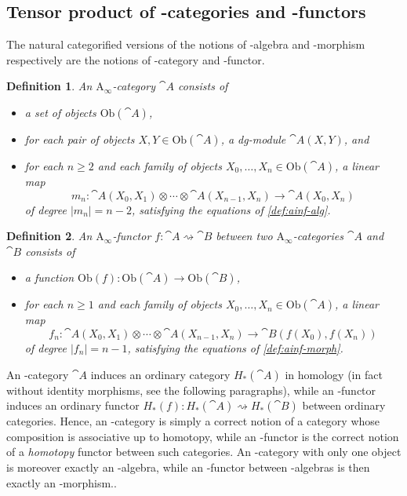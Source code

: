 \documentclass[twoside, 12pt]{amsart}
\newtheorem{definition}{Definition}[section]
\theoremstyle{remark}
\begin{document}
\subsection{Tensor product of \Ainf -categories and \Ainf -functors}

The natural categorified versions of the notions of \Ainf -algebra and \Ainf -morphism respectively are the notions of \Ainf -category and \Ainf -functor.

\begin{definition} 
An $\mathrm{A}_\infty$-category $\cat{A}$ consists of 
\begin{itemize}[leftmargin=*]
  \item a set of objects $\mathrm{Ob}(\cat{A})$,
  \item for each pair of objects $X,Y \in \mathrm{Ob}(\cat{A})$, a dg-module $\cat{A}(X,Y)$, and
  \item for each $n\geq 2$ and each family of objects $X_0,\ldots,X_n \in \mathrm{Ob}(\cat{A})$, a linear map \[m_n : \cat{A}(X_0,X_1) \otimes \cdots \otimes \cat{A}(X_{n-1},X_n) \to \cat{A}(X_0,X_n)\] of degree $|m_n|=n-2$, satisfying the equations of \cref{def:ainf-alg}.
\end{itemize}
\end{definition}

\begin{definition}
An $\mathrm{A}_\infty$-functor $f : \cat{A} \rightsquigarrow \cat{B}$ between two $\mathrm{A}_\infty$-categories $\cat{A}$ and $\cat{B}$ consists of
\begin{itemize}[leftmargin=*]
\item a function $\mathrm{Ob}(f) : \mathrm{Ob}(\cat{A}) \to \mathrm{Ob}(\cat{B})$,
\item for each $n \geq 1$ and each family of objects $X_0, \ldots, X_n \in \mathrm{Ob}(\cat{A})$, a linear map \[f_n : \cat{A}(X_0,X_1) \otimes \cdots \otimes \cat{A}(X_{n-1},X_n) \to \cat{B}(f(X_0),f(X_n))\] of degree $|f_n|=n-1$, satisfying the equations of \cref{def:ainf-morph}.
\end{itemize}
\end{definition}

An \Ainf -category $\cat{A}$ induces an ordinary category $H_*(\cat{A})$ in homology (in fact without identity morphisms, see the following paragraphs), while an \Ainf -functor induces an ordinary functor $H_*(f) : H_*(\cat{A}) \rightsquigarrow H_*(\cat{B})$ between ordinary categories. Hence, an \Ainf -category is simply a correct notion of a category whose composition is associative up to homotopy, while an \Ainf -functor is the correct notion of a \emph{homotopy} functor between such categories.
An \Ainf -category with only one object is moreover exactly an \Ainf -algebra, while an \Ainf -functor between \Ainf -algebras is then exactly an \Ainf -morphism..
\end{document}

